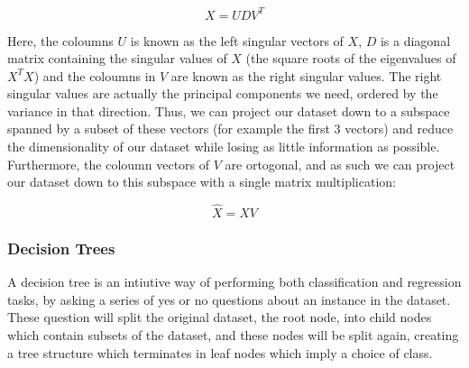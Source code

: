 \documentclass[onecolumn,10pt,cleanfoot]{asme2ej}
\begin{document}
\begin{equation}
X = UDV^T
\end{equation}

Here, the coloumns $U$ is known as the left singular vectors of $X$, $D$ is a diagonal matrix containing the singular values of $X$ (the square roots of the eigenvalues of $X^TX$) and the coloumns in $V$ are known as the right singular values. The right singular values are actually the principal components we need, ordered by the variance in that direction. Thus, we can project our dataset down to a subspace spanned by a subset of these vectors (for example the first 3 vectors) and reduce the dimensionality of our dataset while losing as little information as possible. Furthermore, the coloumn vectors of $V$ are ortogonal, and as such we can project our dataset down to this subspace with a single matrix multiplication:

\begin{equation}
\hat{X} = XV
\end{equation}


\subsubsection{Decision Trees}

A decision tree is an intiutive way of performing both classification and regression tasks, by asking a series of yes or no questions about an instance in the dataset. These question will split the original dataset, the root node, into child nodes which contain subsets of the dataset, and these nodes will be split again, creating a tree structure which terminates in leaf nodes which imply a choice of class.
\end{document}
